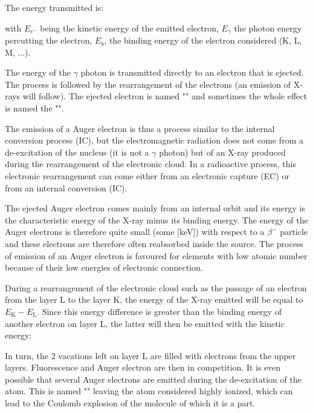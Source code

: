 	The energy transmitted is:
	
	with $E_{e^{-}}$ being the kinetic energy of the emitted electron, $E_\gamma$ the photon energy percutting the electron, $E_b$, the binding energy of the electron considered (K, L, M, ...).
	
	The energy of the $\gamma$ photon is transmitted directly to an electron that is ejected. The process is followed by the rearrangement of the electrons (an emission of X-rays will follow). The ejected electron is named "" and sometimes the whole effect is named the "".
	
	The emission of a Auger electron is thus a process similar to the internal conversion process (IC), but the electromagnetic radiation does not come from a de-excitation of the nucleus (it is not a $\gamma$ photon) but of an X-ray produced during the rearrangement of the electronic cloud. In a radioactive process, this electronic rearrangement can come either from an electronic capture (EC) or from an internal conversion (IC).

	The ejected Auger electron comes mainly from an internal orbit and its energy is the characteristic energy of the X-ray minus its binding energy. The energy of the Auger electrons is therefore quite small (some [keV]) with respect to a  $\beta^{-}$ particle and these electrons are therefore often reabsorbed inside the source. The process of emission of an Auger electron is favoured for elements with low atomic number because of their low energies of electronic connection.

	During a rearrangement of the electronic cloud such as the passage of an electron from the layer L to the layer K, the energy of the X-ray emitted will be equal to $E_\text{K}-E_\text{L}$. Since this energy difference is greater than the binding energy of another electron on layer L, the latter will then be emitted with the kinetic energy:
	
	In turn, the $2$ vacations left on layer L are filled with electrons from the upper layers. Fluorescence and Auger electron are then in competition. It is even possible that several Auger electrons are emitted during the de-excitation of the atom. This is named "" leaving the atom considered highly ionized, which can lead to the Coulomb explosion of the molecule of which it is a part.
	
